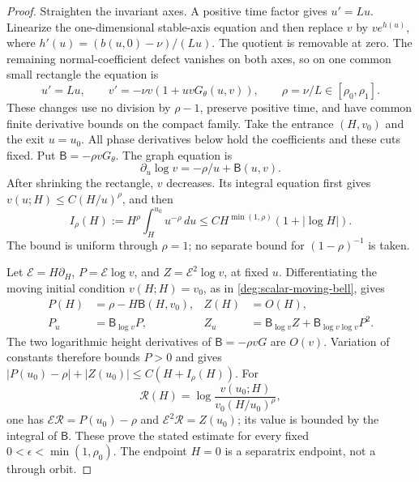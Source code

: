 \begin{proof}
Straighten the invariant axes. A positive time factor gives
\(u'=Lu\). Linearize the one-dimensional stable-axis equation and
then replace \(v\) by \(ve^{h(u)}\), where
\(h'(u)=(b(u,0)-\nu)/(Lu)\). The quotient is removable at zero.
The remaining normal-coefficient defect vanishes on both axes, so
on one common small rectangle the equation is
\[
 u'=Lu,\qquad v'=-\nu v(1+uvG_\theta(u,v)),
 \qquad \rho=\nu/L\in[\rho_0,\rho_1].
\]
These changes use no division by \(\rho-1\), preserve positive
time, and have common finite derivative bounds on the compact family.
Take the entrance \((H,v_0)\) and the exit \(u=u_0\).
All phase derivatives below hold the coefficients and these cuts fixed.
Put \(\mathsf B=-\rho vG_\theta\). The graph equation is
\[
 \partial_u\log v=-\rho/u+\mathsf B(u,v).
\]
After shrinking the rectangle, \(v\) decreases. Its integral
equation first gives \(v(u;H)\le C(H/u)^\rho\), and then
\[
 I_\rho(H):=H^\rho\int_H^{u_0}u^{-\rho}\,du
 \le CH^{\min(1,\rho)}(1+|\log H|).
\]
The bound is uniform through \(\rho=1\); no separate bound for
\((1-\rho)^{-1}\) is taken.

Let \(\mathcal E=H\partial_H\), \(P=\mathcal E\log v\), and
\(Z=\mathcal E^2\log v\), at fixed \(u\). Differentiating the
moving initial condition \(v(H;H)=v_0\), as in
\eqref{deg:scalar-moving-bell}, gives
\[
 \begin{aligned}
 P(H)&=\rho-H\mathsf B(H,v_0),& Z(H)&=O(H),\\
 P_u&=\mathsf B_{\log v}P,
 &Z_u&=\mathsf B_{\log v}Z+\mathsf B_{\log v\log v}P^2.
 \end{aligned}
\]
The two logarithmic height derivatives of \(\mathsf B=-\rho vG\)
are \(O(v)\). Variation of constants therefore bounds \(P>0\) and gives
\( |P(u_0)-\rho|+|Z(u_0)|\le C(H+I_\rho(H))\).
For
\[
 \mathcal R(H)=\log\frac{v(u_0;H)}{v_0(H/u_0)^\rho},
\]
one has \(\mathcal E\mathcal R=P(u_0)-\rho\) and
\(\mathcal E^2\mathcal R=Z(u_0)\); its value is bounded by
the integral of \(\mathsf B\). These prove the stated estimate
for every fixed \(0<\epsilon<\min(1,\rho_0)\).
The endpoint \(H=0\) is a separatrix endpoint, not a through orbit.
\end{proof}
